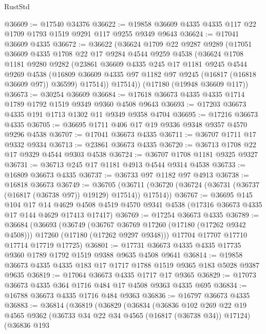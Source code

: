 \begin{lexlean}{RustStd}
\begin{coremodule}
@36609 := @17540 @34376
@36622 := @19858 @36609 @4335 @4335 @117 @22 @1709 @1793 @1519 @9291 @117 @9255 @9349 @9643
@36624 := @17041 @36609 @4335
@36672 := @36622
    (@36624
      @1709
      @22
      @9287
      @9289
      (@17051
        @36609
        @4335
        @1708
        @22
        @17
        @9284
        @4544
        @9259
        @4538
        (@36624
          @1708
          @1181
          @9280
          @9282
          (@23861
            @36609
            @4335
            @245
            @17
            @1181
            @9245
            @4544
            @9269
            @4538
            (@16809 @36609 @4335 @97 @1182 @97 @9245 (@16817 (@16818 @36609 @97)) @36599)
            @17514))
        @17514))
    (@17180 (@19948 @36609 @117))
@36673 := @30254 @36609
@36684 := @17618 @36673 @4335 @4335 @1714 @1789 @1792 @1519 @9349 @9360 @4508 @9643
@36693 := @17203 @36673 @4335 @191 @1713 @1302 @11 @9349 @9358 @4704
@36695 := @17216 @36673 @4335
@36705 := @36695 @1711 @406 @17 @19 @9336 @9348 @9357 @4570 @9296 @4538
@36707 := @17041 @36673 @4335
@36711 := @36707 @1711 @17 @9332 @9334
@36713 := @23861 @36673 @4335
@36720 := @36713 @1708 @22 @17 @9329 @4544 @9303 @4538
@36724 := @36707 @1708 @1181 @9325 @9327
@36731 := @36713 @245 @17 @1181 @4913 @4544 @9314 @4538
@36733 := @16809 @36673 @4335
@36737 := @36733 @97 @1182 @97 @4913
@36738 := @16818 @36673
@36749 := @36705
    (@36711 (@36720 (@36724 (@36731 (@36737 (@16817 (@36738 @97)) @19129) @17514)) @17514))
@36767 := @36695
    @145
    @104
    @17
    @14
    @4629
    @4508
    @4519
    @4570
    @9341
    @4538
    (@17316 @36673 @4335 @17 @144 @4629 @17413 @17417)
@36769 := @17254 @36673 @4335
@36789 := @36684
    (@36693
      (@36749
        (@36767 @36769 @17260 (@17180 (@17262 @9342 @4508)))
        @17260
        (@17180 (@17262 @9297 @9348)))
      @17704
      @17707
      @17710
      @17714
      @17719
      @17725)
@36801 := @17731 @36673 @4335 @4335 @17735 @9360 @1789 @1792 @1519 @9388 @9635 @4508 @9641
@36814 := @19858 @36673 @4335 @4335 @183 @17 @1717 @1788 @1519 @9365 @183 @5028 @9387 @9635
@36819 := @17064 @36673 @4335 @1717 @17 @9365
@36829 := @17073 @36673 @4335 @364 @1716 @484 @17 @4508 @9363 @4335 @695
@36834 := @16788 @36673 @4335 @1716 @484 @9363
@36836 := @16797 @36673 @4335
@36883 := @36814
    (@36819
      (@36829
        (@36834
          (@36836
            @102
            @269
            @22
            @19
            @4565
            @9362
            (@36733 @34 @22 @34 @4565 (@16817 (@36738 @34)) @17124)
            (@36836
              @193

\end{coremodule}
\end{lexlean}
